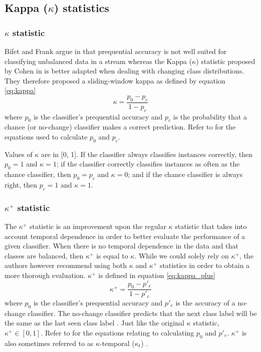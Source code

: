 \subsection{Kappa ($\kappa$) statistics\label{section:kappa_stats}}
\subsubsection{$\kappa$ statistic}
Bifet and Frank argue in \cite{bifet2010sentiment} that prequential accuracy is not well suited for classifying unbalanced data in a stream whereas the Kappa ($\kappa$) statistic proposed by Cohen in \cite{cohen1960coefficient} is better adapted when dealing with changing class distributions. They therefore proposed a sliding-window kappa as defined by equation \ref{eq:kappa}
\begin{equation}
\kappa=\frac{p_0-p_c}{1-p_c}
\label{eq:kappa}
\end{equation}where $p_0$ is the classifier's prequential accuracy and $p_c$ is the probability that a chance (or no-change) classifier makes a correct prediction. Refer to \cite{bifet2010sentiment} for the equations used to calculate $p_0$ and $p_c$.

Values of $\kappa$ are in [0, 1]. If the classifier always classifies instances correctly, then $p_0=1$ and $\kappa=1$; if the classifier correctly classifies instances as often as the chance classifier, then $p_0 = p_c$ and $\kappa=0$; and if the chance classifier is always right, then $p_c=1$ and $\kappa=1$.

\subsubsection{$\kappa^+$ statistic\label{section:kappa_t}}
The $\kappa^+$ statistic is an improvement upon the regular $\kappa$ statistic that takes into account temporal dependence in order to better evaluate the performance of a given classifier. When there is no temporal dependence in the data and that classes are balanced, then $\kappa^+$ is equal to $\kappa$. While we could solely rely on $\kappa^+$, the authors however recommend using both $\kappa$ and $\kappa^+$ statistics in order to obtain a more thorough evaluation.
$\kappa^+$ is defined in equation \ref{eq:kappa_plus}
\begin{equation}
\label{eq:kappa_plus}
\kappa^+=\frac{p_0-p'_e}{1-p'_e}
\end{equation}where $p_0$ is the classifier's prequential accuracy and $p'_e$ is the accuracy of a no-change classifier. The no-change classifier predicts that the next class label will be the same as the last seen class label \cite{bifet2015efficient}. Just like the original $\kappa$ statistic, $\kappa^+\in [0, 1]$. Refer to \cite{DBLP:conf/pkdd/2013-1} for the equations relating to calculating $p_0$ and $p'_e$. $\kappa^+$ is also sometimes referred to as $\kappa$-temporal ($\kappa_t$) \cite{vzliobaite2015evaluation}.

